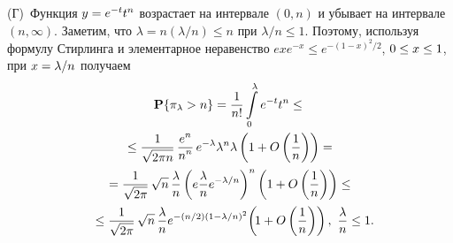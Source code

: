 \begin{multicols}{2}
(Г)~Функция $y\hm=e^{-t}t^n$ возрастает на интервале $(0, n)$ и
убывает на интервале  $(n, \infty)$. Заметим, что
$\lambda=n({\lambda}/{n})\le n$ при ${\lambda}/{n}\le 1$.
Поэтому, используя формулу Стирлинга и элементарное неравенство $e x
e^{-x}\le e^{-{(1-x)^2}/{2}}$, $0\hm\le x\hm\le 1$, при
$x\hm={\lambda}/{n}$ по\-лу\-чаем
\begin{multline*}
\mathbf{P}\{\pi_{\lambda}>n\}=\fr{1}{n!}\int\limits_0^{\lambda}e^{-t}t^n\le{}\\
{}\le\fr{1}{\sqrt{2\pi
n}}\,\fr{e^n}{n^n}\,e^{-\lambda}\lambda^n\lambda\left(1+O\left(\fr{1}{n}\right)\right)={}\\
{}=\fr{1}{\sqrt{2\pi}}\,\sqrt{n}\,\fr{\lambda}{n}\left(e\fr{\lambda}{n}e^{-{\lambda}/{n}}\right)^n
\left(1+O\left(\fr{1}{n}\right)\right)
\le{}\\
{}\le \fr{1}{\sqrt{2\pi}}\, \sqrt{n}\,\fr{\lambda}{n}e^{-({n}/{2})\left(1-{\lambda}/{n}\right)^2}
\!\left(\!1+O\left(\fr{1}{n}\right)\right),\
\fr{\lambda}{n}\le 1.\hspace*{-4.80296pt}
\end{multline*}


\smallskip


\end{multicols}
